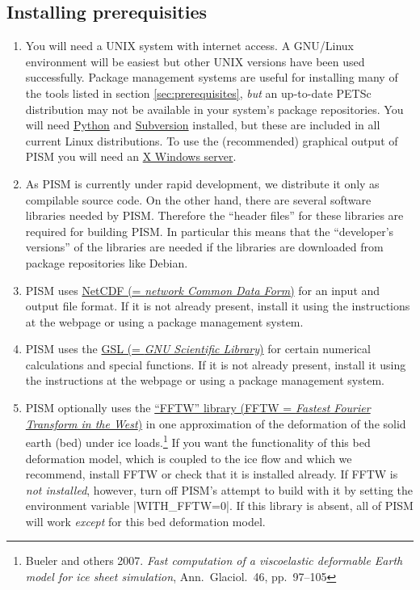 \documentclass[11pt,final]{amsart}
\begin{document}
\subsection{Installing prerequisities}
\renewcommand{\labelenumi}{\textbf{\arabic{enumi}.}~}
\begin{enumerate}
\item You will need a UNIX system with internet access. A GNU/Linux environment will be easiest but other UNIX versions have been
  used successfully. Package management systems are useful for installing many of the tools listed in section
  \ref{sec:prerequisites}, \emph{but} an up-to-date PETSc distribution may not be available in your system's package
  repositories. You will need \href{http://www.python.org/}{Python} and \href{http://subversion.tigris.org/}{Subversion}
  installed, but these are included in all current Linux distributions. To use the (recommended) graphical output of PISM you will
  need an \href{http://www.x.org/}{X Windows server}.

\item As PISM is currently under rapid development, we distribute it only as compilable source code. On the other hand, there are
  several software libraries needed by PISM. Therefore the ``header files'' for these libraries are required for building PISM. In
  particular this means that the ``developer's versions'' of the libraries are needed if the libraries are downloaded from package
  repositories like Debian.

\item PISM uses \href{http://www.unidata.ucar.edu/software/netcdf/}{NetCDF (= \emph{network Common Data Form})} for
  an input and output file format. If it is not already present, install it using the instructions at the webpage or using a
  package management system.

\item PISM uses the \href{http://www.gnu.org/software/gsl/}{GSL (= \emph{GNU Scientific Library})} for certain numerical calculations and special functions. If it is not already present, install it using the
  instructions at the webpage or using a package management system.

\item PISM optionally uses the \href{http://www.fftw.org/}{``FFTW'' library (FFTW = \emph{Fastest Fourier Transform in the
      West})} in one approximation of the deformation of the solid earth (bed) under
  ice loads.\footnote{Bueler and others 2007. \emph{Fast computation of a viscoelastic deformable Earth
model for ice sheet simulation}, Ann.~Glaciol.~46, pp.~97–105}  If you want the functionality of this bed deformation model, which is coupled to the ice flow and which we
  recommend, install FFTW or check that it is installed already.  If FFTW is \emph{not installed}, however, turn off PISM's attempt
  to build with it by setting the environment variable |WITH_FFTW=0|.  If this library is absent, all of PISM will work
  \emph{except} for this bed deformation model.


\end{enumerate}
\end{document}
